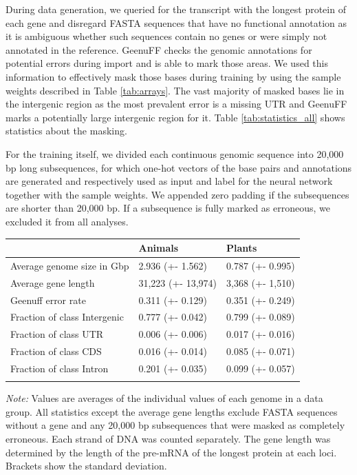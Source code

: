 \documentclass{bioinfo}
\begin{document}
\begin{methods}
During data generation, we queried for the transcript with the longest protein of each gene and 
disregard FASTA sequences that have no functional annotation as it is ambiguous
whether such sequences contain no genes or 
were simply not annotated in the reference. GeenuFF checks the 
genomic annotations for potential errors during import and is able to mark those 
areas. We used this information to effectively mask those bases during training 
by using the sample weights described in Table \ref{tab:arrays}. The vast majority 
of masked bases lie in the intergenic region as the most prevalent error is a 
missing UTR and GeenuFF marks a potentially large intergenic region for it. Table 
\ref{tab:statistics_all} shows statistics about the masking. 

For the training itself, we divided each continuous genomic sequence into 20,000 bp 
long subsequences, for which one-hot vectors of the base pairs and annotations 
are generated and respectively used as input and label for the neural network 
together with the sample weights. We appended zero padding if the subsequences  
are shorter than 20,000 bp. 
If a subsequence is fully marked as erroneous, we excluded it from all analyses. 

\begin{table}[!htb]
 {
\begin{tabular}{@{}lll@{}}
\toprule & Animals & Plants\\
\midrule
Average genome size in Gbp& 2.936 (+- 1.562) & 0.787 (+- 0.995) \\
Average gene length & 31,223 (+- 13,974)& 3,368 (+- 1,510)\\
Geenuff error rate & 0.311 (+- 0.129) & 0.351 (+- 0.249) \\
Fraction of class Intergenic  & 0.777 (+- 0.042) & 0.799 (+- 0.089) \\
Fraction of class UTR & 0.006 (+- 0.006) & 0.017 (+- 0.016) \\
Fraction of class CDS & 0.016 (+- 0.014) & 0.085 (+- 0.071) \\
Fraction of class Intron & 0.201 (+- 0.035) & 0.099 (+- 0.057) \\
\botrule
\end{tabular}}{{\it Note:} Values are averages of the individual values of each 
genome in a data group. All statistics except the average gene lengths exclude
FASTA sequences without a gene and any 20,000 bp subsequences that were masked as completely 
erroneous. Each strand of DNA was counted separately. The gene length was 
determined by the length of the pre-mRNA of the longest protein at each
loci. Brackets show the standard deviation.}
\end{table}



\end{methods}
\end{document}
